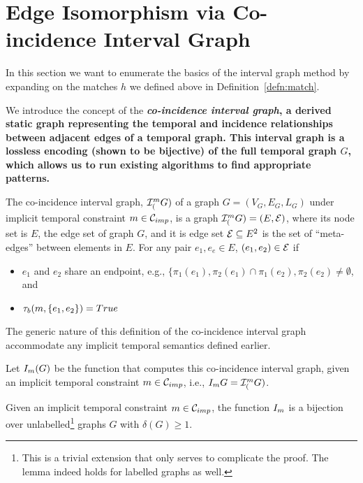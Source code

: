 \section{Edge Isomorphism via Co-incidence Interval Graph}

In this section we want to enumerate the basics of the interval graph method by
expanding on the matches $h$ we defined above in Definition~\ref{defn:match}. 

We introduce the concept of the {\bf {\em co-incidence interval graph}, a
  derived static graph representing the temporal and incidence relationships
  between adjacent edges of a temporal graph. This interval graph is a lossless
  encoding (shown to be bijective) of the full temporal graph $G$, which allows
  us to run existing algorithms to find appropriate patterns.}

\begin{defn}
  \label{def:ci_graph}
  The co-incidence interval graph, $\mathcal{I}_{(}^{m}G)$ of a graph $G =
  (V_G,E_G, L_G)$ under implicit temporal constraint $m \in \mathcal{C}_{imp}$, is a
  graph $\mathcal{I}_{(}^{m}G) = (E, \mathcal{E})$, where its node set is $E$, the edge
  set of graph $G$, and it is edge set $\mathcal{E} \subseteq E^2$ is the set of
  ``meta-edges'' between elements in $E$. For any pair $e_1, e_e \in E$,
  $(e_1,e_2) \in \mathcal{E}$ if
  \begin{itemize}
    \item $e_1$ and $e_2$ share an endpoint, e.g., $\{\pi_1(e_1), \pi_2(e_1)
      \cap \pi_1(e_2), \pi_2(e_2) \neq \emptyset$, and
    \item $\tau_b(m,\{e_1,e_2\}) = True$
  \end{itemize}
\end{defn}

The generic nature of this definition of the co-incidence interval graph accommodate any 
implicit temporal semantics defined earlier.



 Let $I_{m}(G)$ be the function that computes this co-incidence interval
 graph, given an implicit temporal constraint $m \in \mathcal{C}_{imp}$, i.e.,
 $I_{m}{G} = \mathcal{I}_{(}^{m}G)$.

\begin{lemma}
  \label{lem:ci_biject}
  Given an implicit temporal constraint $m \in \mathcal{C}_{imp}$, the function
  $I_{m}$ is a bijection over unlabelled\footnote{This is a trivial
    extension that only serves to complicate the proof. The lemma indeed holds
    for labelled graphs as well.}  graphs $G$ with $\delta(G) \geq 1$.
\end{lemma}

